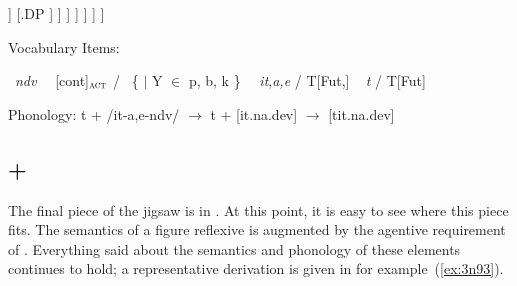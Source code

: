 \begin{exe}
\begin{xlist}
\begin{xlist}
\begin{exe}
\begin{xlist}
\begin{xlist}
\begin{exe}
\begin{xlist}
\begin{xlist}
\begin{exe}
\begin{exe}
\begin{xlist}
\begin{exe}
\begin{exe}
\begin{xlist}
\begin{exe}
\begin{exe}
\begin{exe}
\begin{exe}
\begin{exe}
\begin{xlist}
\begin{exe}
\begin{xlist}
\begin{exe}
\begin{exe}
\begin{xlist}
\begin{exe}
\begin{xlist}
\begin{exe}
\begin{xlist}
\begin{exe}
\begin{exe}
\begin{exe}
\begin{xlist}
\begin{exe}
\begin{exe}
\begin{exe}
\begin{xlist}
\begin{exe}
\begin{xlist}
\begin{exe}
\begin{exe}
\begin{xlist}
\begin{exe}
\begin{exe}
\begin{exe}
\begin{exe}
\begin{xlist}
\begin{exe}
\begin{xlist}
\begin{exe}
\begin{xlist}
\begin{exe}
\begin{xlist}
\begin{exe}
\begin{xlist}
\begin{exe}
\begin{xlist}
\begin{exe}
\begin{exe}
\begin{xlist}
\begin{exe}
\begin{xlist}
\begin{exe}
\begin{exe}
\begin{xlist}
\begin{exe}
\begin{xlist}
\begin{exe}
\begin{exe}
\begin{exe}
\begin{exe}
\begin{xlist}
\begin{xlist}
\begin{exe}
\begin{xlist}
\begin{exe}
\begin{exe}
\begin{exe}
\begin{xlist}
\begin{exe}
\begin{exe}
\begin{xlist}
\begin{exe}
\begin{exe}
\begin{exe}
\begin{xlist}
\begin{xlist}
\begin{exe}
\begin{xlist}
\begin{exe}
\begin{exe}
\begin{exe}
\begin{exe}
\begin{xlist}
\begin{exe}
\begin{xlist}
\begin{exe}
\begin{xlist}
\begin{exe}
\begin{xlist}
\begin{exe}
\begin{exe}
\begin{exe}
\begin{exe}
\begin{exe}
\begin{xlist}
\begin{exe}
     					    [.v ]
	        					]
	        				    [.DP ]
	        				]
        			    ]
        		    ]
        		]
        	]
        	]

 \ex \label{ex:titpane2}Vocabulary Items: 
 \begin{xlist} 
     \ex  {} \lra~\emph{ndv} 
     \ex  \va~\lra~[\textminus{}cont]$_{\gsc{ACT}}$ / {\trace}~\{  $|$ Y $\in$ p, b, k \} 
     \ex  \vz~\lra~\emph{it},\emph{a,e} / T[Fut,] {\trace} \va 
      \lra~ \emph{t} / {\trace} T[Fut] 
 \z

\ex  Phonology: 
 	t + /it-a,e-ndv/ $\rightarrow$ t + [it.na.dev] $\rightarrow$ [tit.na.dev]
 \z 
    
	\subsection{{\va} + {\pz}} \label{vz:va:pzva}
The final piece of the jigsaw is  in {\thit}. At this point, it is easy to see where this piece fits. The semantics of a figure reflexive {\pz} is augmented by the agentive requirement of {\va}. Everything said about the semantics and phonology of these elements continues to hold; a representative derivation is given in  for example~(\ref{ex:3n93}).

 \begin{exe}
\end{exe}

\begin{sidewaysfigure}
	\caption{Derivation 
\end{sidewaysfigure}
\end{xlist}
\end{exe}
\end{xlist}
\end{exe}
\end{exe}
\end{exe}
\end{exe}
\end{exe}
\end{xlist}
\end{exe}
\end{xlist}
\end{exe}
\end{xlist}
\end{exe}
\end{xlist}
\end{exe}
\end{exe}
\end{exe}
\end{exe}
\end{xlist}
\end{exe}
\end{xlist}
\end{xlist}
\end{exe}
\end{exe}
\end{exe}
\end{xlist}
\end{exe}
\end{exe}
\end{xlist}
\end{exe}
\end{exe}
\end{exe}
\end{xlist}
\end{exe}
\end{xlist}
\end{xlist}
\end{exe}
\end{exe}
\end{exe}
\end{exe}
\end{xlist}
\end{exe}
\end{xlist}
\end{exe}
\end{exe}
\end{xlist}
\end{exe}
\end{xlist}
\end{exe}
\end{exe}
\end{xlist}
\end{exe}
\end{xlist}
\end{exe}
\end{xlist}
\end{exe}
\end{xlist}
\end{exe}
\end{xlist}
\end{exe}
\end{xlist}
\end{exe}
\end{exe}
\end{exe}
\end{exe}
\end{xlist}
\end{exe}
\end{exe}
\end{xlist}
\end{exe}
\end{xlist}
\end{exe}
\end{exe}
\end{exe}
\end{xlist}
\end{exe}
\end{exe}
\end{exe}
\end{xlist}
\end{exe}
\end{xlist}
\end{exe}
\end{xlist}
\end{exe}
\end{exe}
\end{xlist}
\end{exe}
\end{xlist}
\end{exe}
\end{exe}
\end{exe}
\end{exe}
\end{exe}
\end{xlist}
\end{exe}
\end{exe}
\end{xlist}
\end{exe}
\end{exe}
\end{xlist}
\end{xlist}
\end{exe}
\end{xlist}
\end{xlist}
\end{exe}
\end{xlist}
\end{xlist}
\end{exe}
